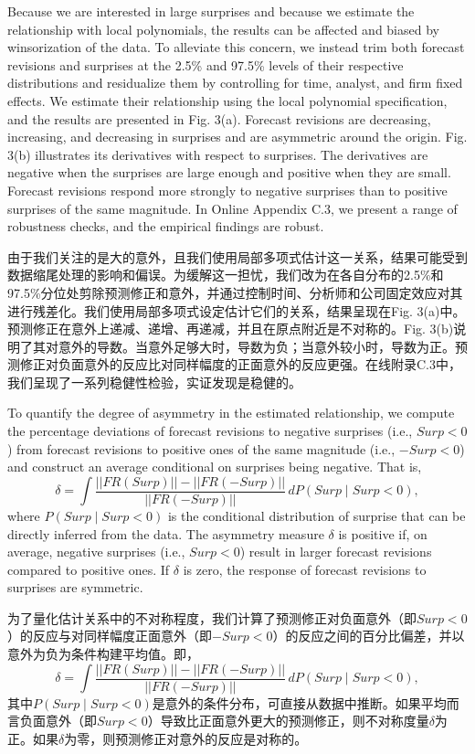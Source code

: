 \documentclass[12pt,a4paper]{article}
\newenvironment{original}
  {\par\medskip\noindent\ignorespaces}
  {\par\medskip}
\newenvironment{translation}
  {\par\noindent{\color{transblue}\ignorespaces}}
  {\par\bigskip}
\begin{document}
\begin{original}
Because we are interested in large surprises and because we estimate the relationship with local polynomials, the results can be affected and biased by winsorization of the data. To alleviate this concern, we instead trim both forecast revisions and surprises at the 2.5\% and 97.5\% levels of their respective distributions and residualize them by controlling for time, analyst, and firm fixed effects. We estimate their relationship using the local polynomial specification, and the results are presented in Fig. 3(a). Forecast revisions are decreasing, increasing, and decreasing in surprises and are asymmetric around the origin. Fig. 3(b) illustrates its derivatives with respect to surprises. The derivatives are negative when the surprises are large enough and positive when they are small. Forecast revisions respond more strongly to negative surprises than to positive surprises of the same magnitude. In Online Appendix C.3, we present a range of robustness checks, and the empirical findings are robust.
\end{original}
\begin{translation}
由于我们关注的是大的意外，且我们使用局部多项式估计这一关系，结果可能受到数据缩尾处理的影响和偏误。为缓解这一担忧，我们改为在各自分布的2.5\%和97.5\%分位处剪除预测修正和意外，并通过控制时间、分析师和公司固定效应对其进行残差化。我们使用局部多项式设定估计它们的关系，结果呈现在Fig. 3(a)中。预测修正在意外上递减、递增、再递减，并且在原点附近是不对称的。Fig. 3(b)说明了其对意外的导数。当意外足够大时，导数为负；当意外较小时，导数为正。预测修正对负面意外的反应比对同样幅度的正面意外的反应更强。在线附录C.3中，我们呈现了一系列稳健性检验，实证发现是稳健的。
\end{translation}

\begin{original}
To quantify the degree of asymmetry in the estimated relationship, we compute the percentage deviations of forecast revisions to negative surprises (i.e., $Surp < 0$) from forecast revisions to positive ones of the same magnitude (i.e., $-Surp < 0$) and construct an average conditional on surprises being negative. That is,
\[
\delta = \int \frac{||FR(Surp)|| - ||FR(-Surp)||}{||FR(-Surp)||} \, dP(Surp \mid Surp < 0), \tag{2}
\]
where $P(Surp \mid Surp < 0)$ is the conditional distribution of surprise that can be directly inferred from the data. The asymmetry measure $\delta$ is positive if, on average, negative surprises (i.e., $Surp < 0$) result in larger forecast revisions compared to positive ones. If $\delta$ is zero, the response of forecast revisions to surprises are symmetric.
\end{original}
\begin{translation}
为了量化估计关系中的不对称程度，我们计算了预测修正对负面意外（即$Surp < 0$）的反应与对同样幅度正面意外（即$-Surp < 0$）的反应之间的百分比偏差，并以意外为负为条件构建平均值。即，
\[
\delta = \int \frac{||FR(Surp)|| - ||FR(-Surp)||}{||FR(-Surp)||} \, dP(Surp \mid Surp < 0), \tag{2}
\]
其中$P(Surp \mid Surp < 0)$是意外的条件分布，可直接从数据中推断。如果平均而言负面意外（即$Surp < 0$）导致比正面意外更大的预测修正，则不对称度量$\delta$为正。如果$\delta$为零，则预测修正对意外的反应是对称的。
\end{translation}
\end{document}
